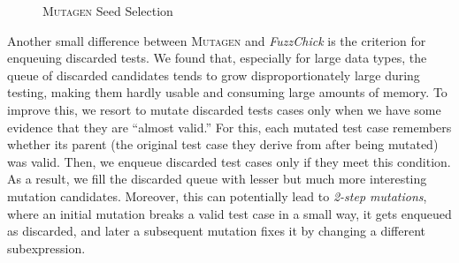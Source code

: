 \documentclass[acmsmall, anonymous]{acmart}
\newcommand{\fuzzchick}{\textit{FuzzChick}\xspace}
\newcommand{\mutagen}{\textsc{Mutagen}\xspace}
\begin{document}
\begin{figure}[t]
\vspace{-15pt}
\begin{multicols}{2}

\begin{algorithm}[H]
  \SetInd{0em}{0.75em}
  \SetAlgoLined
  \DontPrintSemicolon
\caption{\label{algo:mutagen:loop}\mutagen Testing Loop}
\end{algorithm}

\columnbreak

\begin{algorithm}[H]
  \SetInd{0em}{0.75em}
  \SetAlgoLined
  \DontPrintSemicolon
\caption{\label{algo:mutagen:pick}\mutagen Seed Selection}
\vspace{1pt}
\end{algorithm}
\end{multicols}
\vspace{-10pt}
\end{figure}

Another small difference between \mutagen and \fuzzchick is the criterion for
enqueuing discarded tests.
%
We found that, especially for large data types, the queue of discarded
candidates tends to grow disproportionately large during testing, making them
hardly usable and consuming large amounts of memory.
%
To improve this, we resort to mutate discarded tests cases only when we have
some evidence that they are ``almost valid.''
%
For this, each mutated test case remembers whether its parent (the original test
case they derive from after being mutated) was valid.
%
Then, we enqueue discarded test cases only if they meet this condition.
%
As a result, we fill the discarded queue with lesser but much more interesting
mutation candidates.
%
Moreover, this can potentially lead to \emph{2-step mutations}, where an initial
mutation breaks a valid test case in a small way, it gets enqueued as discarded,
and later a subsequent mutation fixes it by changing a different subexpression.
\end{document}
